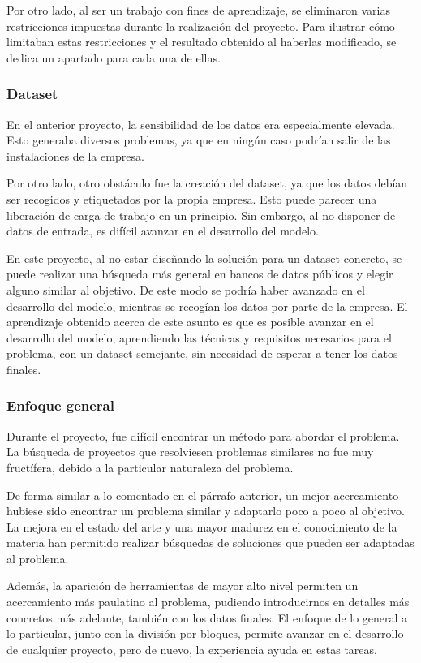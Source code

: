 Por otro lado, al ser un trabajo con fines de aprendizaje, se eliminaron varias restricciones impuestas durante la realización del proyecto.
Para ilustrar cómo limitaban estas restricciones y el resultado obtenido al haberlas modificado, se dedica un apartado para cada una de ellas.

\subsubsection{Dataset}
En el anterior proyecto, la sensibilidad de los datos era especialmente elevada.
Esto generaba diversos problemas, ya que en ningún caso podrían salir de las instalaciones de la empresa.

Por otro lado, otro obstáculo fue la creación del dataset, ya que los datos debían ser recogidos y etiquetados por la propia empresa.
Esto puede parecer una liberación de carga de trabajo en un principio. 
Sin embargo, al no disponer de datos de entrada, es difícil avanzar en el desarrollo del modelo.

En este proyecto, al no estar diseñando la solución para un dataset concreto, se puede realizar una búsqueda más general en bancos de datos públicos y elegir alguno similar al objetivo.
De este modo se podría haber avanzado en el desarrollo del modelo, mientras se recogían los datos por parte de la empresa.
El aprendizaje obtenido acerca de este asunto es que es posible avanzar en el desarrollo del modelo, aprendiendo las técnicas y requisitos necesarios para el problema, con un dataset semejante, sin necesidad de esperar a tener los datos finales.

\subsubsection{Enfoque general}
Durante el proyecto, fue difícil encontrar un método para abordar el problema.
La búsqueda de proyectos que resolviesen problemas similares no fue muy fructífera, debido a la particular naturaleza del problema.

De forma similar a lo comentado en el párrafo anterior, un mejor acercamiento hubiese sido encontrar un problema similar y adaptarlo poco a poco al objetivo.
La mejora en el estado del arte y una mayor madurez en el conocimiento de la materia han permitido realizar búsquedas de soluciones que pueden ser adaptadas al problema.

Además, la aparición de herramientas de mayor alto nivel permiten un acercamiento más paulatino al problema, pudiendo introducirnos en detalles más concretos más adelante, también con los datos finales.
El enfoque de lo general a lo particular, junto con la división por bloques, permite avanzar en el desarrollo de cualquier proyecto, pero de nuevo, la experiencia ayuda en estas tareas.

